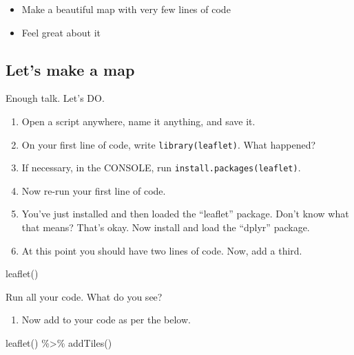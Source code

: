 \documentclass[
]{book}
\newenvironment{Shaded}{\begin{snugshade}}{\end{snugshade}}
\newcommand{\FunctionTok}[1]{\textcolor[rgb]{0.00,0.00,0.00}{#1}}
\newcommand{\NormalTok}[1]{#1}
\newcommand{\SpecialCharTok}[1]{\textcolor[rgb]{0.00,0.00,0.00}{#1}}
\providecommand{\tightlist}{%
  \setlength{\itemsep}{0pt}\setlength{\parskip}{0pt}}
\begin{document}
\begin{itemize}
\tightlist
\item
  Make a beautiful map with very few lines of code
\item
  Feel great about it
\end{itemize}

\hypertarget{lets-make-a-map}{%
\subsection*{Let's make a map}\label{lets-make-a-map}}

Enough talk. Let's DO.

\begin{enumerate}
\def\labelenumi{\arabic{enumi}.}
\item
  Open a script anywhere, name it anything, and save it.
\item
  On your first line of code, write \texttt{library(leaflet)}. What happened?
\item
  If necessary, in the CONSOLE, run \texttt{install.packages(\textquotesingle{}leaflet\textquotesingle{})}.
\item
  Now re-run your first line of code.
\item
  You've just installed and then loaded the ``leaflet'' package. Don't know what that means? That's okay. Now install and load the ``dplyr'' package.
\item
  At this point you should have two lines of code. Now, add a third.
\end{enumerate}

\begin{Shaded}
\begin{Highlighting}[]
\FunctionTok{leaflet}\NormalTok{()}
\end{Highlighting}
\end{Shaded}

Run all your code. What do you see?

\begin{enumerate}
\def\labelenumi{\arabic{enumi}.}
\setcounter{enumi}{6}
\tightlist
\item
  Now add to your code as per the below.
\end{enumerate}

\begin{Shaded}
\begin{Highlighting}[]
\FunctionTok{leaflet}\NormalTok{() }\SpecialCharTok{\%\textgreater{}\%}
  \FunctionTok{addTiles}\NormalTok{()}
\end{Highlighting}
\end{Shaded}
\end{document}
